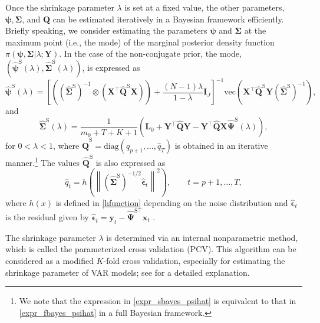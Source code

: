 \documentclass[
]{jss}
\begin{document}
Once the shrinkage parameter \(\lambda\) is set at a fixed value, the
other parameters, \(\boldsymbol\psi, \mathbf{\Sigma}\), and
\(\mathbf{Q}\) can be estimated iteratively in a Bayesian framework
efficiently. Briefly speaking, we consider estimating the parameters
\(\boldsymbol\psi\) and \(\mathbf{\Sigma}\) at the maximum point (i.e.,
the mode) of the marginal posterior density function
\(\pi (\boldsymbol\psi, \mathbf{\Sigma} | \lambda; \mathbf{Y})\). In the
case of the non-conjugate prior, the mode,
\((\widehat{\boldsymbol\psi}^\text{S} (\lambda), \widehat{\mathbf{\Sigma}}^\text{S} (\lambda))\),
is expressed as \begin{equation}
    \label{expr_sbayes_psihat}
    \widehat{\boldsymbol\psi}^{S} (\lambda)  =
    \left[\left(  (\widehat{\mathbf{\Sigma}}^\text{S})^{-1} \otimes
          \left( \mathbf{X}^\top \widehat{\mathbf{Q}}^\text{S} \mathbf{X} \right) \right) + \frac{ (N - 1) \lambda}{1-\lambda} \mathbf{I}_J     \right]^{-1}
    \text{vec}\left( \mathbf{X}^\top \widehat{\mathbf{Q}}^\text{S} \mathbf{Y} ( \widehat{\mathbf{\Sigma}}^\text{S})^{-1} \right),
    \end{equation} and\\
\begin{equation}
    \widehat{\mathbf{\Sigma}}^\text{S} (\lambda) =
    \frac{1}{m_0 + T + K + 1} \left(
    \mathbf{L}_0 + \mathbf{Y}^\top \widehat{\mathbf{Q}} \mathbf{Y} -
    \mathbf{Y}^\top \widehat{\mathbf{Q}} \mathbf{X} \widehat{\mathbf{\Psi}}^\text{S} (\lambda)
    \right),
    \end{equation} for \(0< \lambda < 1\), where
\(\widehat{\mathbf{Q}}^\text{S} = \text{diag}(\hat{q}_{p+1}, \ldots, \hat{q}_T)\)
is obtained in an iterative
manner.\footnote{We note that the expression in \eqref{expr_sbayes_psihat} is equivalent to that in \eqref{expr_fbayes_psihat} in a full Bayesian framework.}
The values \(\widehat{\mathbf{Q}}^\text{S}\) is also expressed as
\begin{equation}
    \hat{q}_t =
    h \left( \left\| (\widehat{\mathbf{\Sigma}}^\text{S})^{-1/2} \hat{\boldsymbol\epsilon}_t \right\|^2 \right),
    \qquad
    t = p+1, \ldots, T,
    \end{equation} where \(h(x)\) is defined in \eqref{hfunction}
depending on the noise distribution and \(\hat{\boldsymbol\epsilon}_t\)
is the residual given by
\(\hat{\boldsymbol\epsilon}_t = \mathbf{y}_t - \widehat{\mathbf{\Psi}}^{\text{S}\top} \mathbf{x}_t\)
\citep{LeeChoiKim2016}.

The shrinkage parameter \(\lambda\) is determined via an internal
nonparametric method, which is called the parameterized cross validation
(PCV). This algorithm can be considered as a modified \(K\)-fold cross
validation, especially for estimating the shrinkage parameter of VAR
models; see \citet{LeeChoiKim2016} for a detailed explanation.
\end{document}
